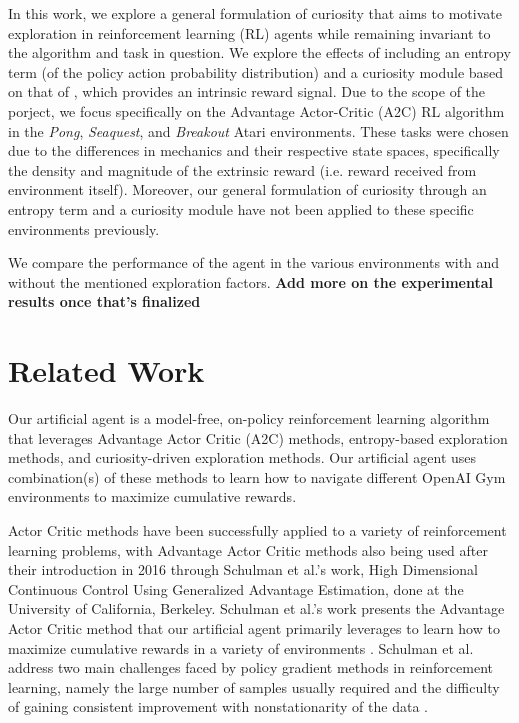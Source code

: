 \documentclass{article}
\begin{document}
In this work, we explore a general formulation of curiosity that aims to motivate exploration in reinforcement learning (RL) agents while remaining invariant to the algorithm and task in question. We explore the effects of including an entropy term (of the policy action probability distribution) and a curiosity module based on that of \cite{curiosity}, which provides an intrinsic reward signal. Due to the scope of the porject, we focus specifically on the Advantage Actor-Critic (A2C) RL algorithm in the \textit{Pong}, \textit{Seaquest}, and \textit{Breakout} Atari environments. These tasks were chosen due to the differences in mechanics and their respective state spaces, specifically the density and magnitude of the extrinsic reward (i.e. reward received from environment itself). Moreover, our general formulation of curiosity through an entropy term and a curiosity module have not been applied to these specific environments previously.

We compare the performance of the agent in the various environments with and without the mentioned exploration factors. \textbf{Add more on the experimental results once that's finalized}

\section{Related Work}
Our artificial agent is a model-free, on-policy reinforcement learning algorithm that leverages Advantage Actor Critic (A2C) methods, entropy-based exploration methods, and curiosity-driven exploration methods. Our artificial agent uses combination(s) of these methods to learn how to navigate different OpenAI Gym \cite{gym} environments to maximize cumulative rewards.

Actor Critic methods have been successfully applied to a variety of reinforcement learning problems, with Advantage Actor Critic methods also being used after their introduction in 2016 through Schulman et al.’s work, High Dimensional Continuous Control Using Generalized Advantage Estimation, done at the University of California, Berkeley. Schulman et al.’s work presents the Advantage Actor Critic method that our artificial agent primarily leverages to learn how to maximize cumulative rewards in a variety of environments \cite{a2c}. Schulman et al. address two main challenges faced by policy gradient methods in reinforcement learning, namely the large number of samples usually required and the difficulty of gaining consistent improvement with nonstationarity of the data \cite{a2c}.
\end{document}
